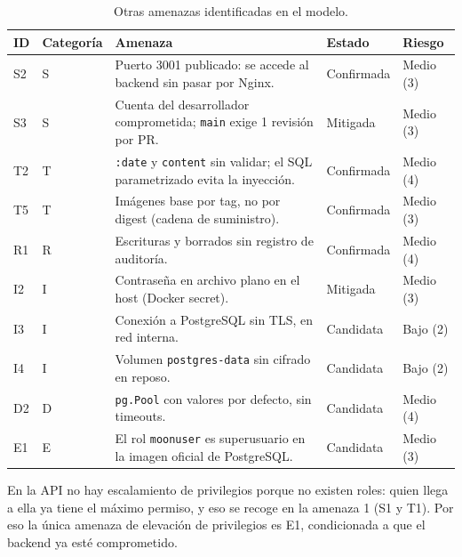 \begin{table}[H]
\centering
\caption{Otras amenazas identificadas en el modelo.}
\label{tab:otras-amenazas}

\begin{tabularx}{\textwidth}{l l X l l}
\toprule
\textbf{ID} &
\textbf{Categoría} &
\textbf{Amenaza} &
\textbf{Estado} &
\textbf{Riesgo} \\
\midrule
S2 & S & Puerto 3001 publicado: se accede al backend sin pasar por Nginx. &
Confirmada & Medio (3) \\

S3 & S & Cuenta del desarrollador comprometida; \texttt{main} exige 1
revisión por PR. & Mitigada & Medio (3) \\

T2 & T & \texttt{:date} y \texttt{content} sin validar; el SQL
parametrizado evita la inyección. & Confirmada & Medio (4) \\

T5 & T & Imágenes base por tag, no por digest (cadena de suministro). &
Confirmada & Medio (3) \\

R1 & R & Escrituras y borrados sin registro de auditoría. &
Confirmada & Medio (4) \\

I2 & I & Contraseña en archivo plano en el host (Docker secret). &
Mitigada & Medio (3) \\

I3 & I & Conexión a PostgreSQL sin TLS, en red interna. &
Candidata & Bajo (2) \\

I4 & I & Volumen \texttt{postgres-data} sin cifrado en reposo. &
Candidata & Bajo (2) \\

D2 & D & \texttt{pg.Pool} con valores por defecto, sin timeouts. &
Candidata & Medio (4) \\

E1 & E & El rol \texttt{moonuser} es superusuario en la imagen oficial de
PostgreSQL. & Candidata & Medio (3) \\
\bottomrule
\end{tabularx}
\end{table}

En la API no hay escalamiento de privilegios porque no existen roles:
quien llega a ella ya tiene el máximo permiso, y eso se recoge en la
amenaza 1 (S1 y T1). Por eso la única amenaza de elevación de privilegios
es E1, condicionada a que el backend ya esté comprometido.


